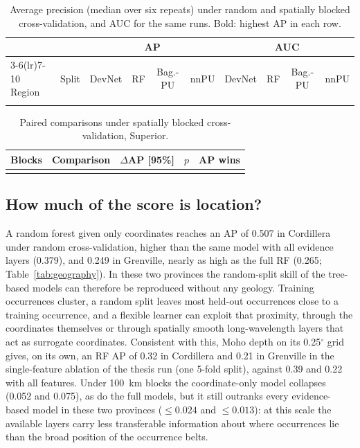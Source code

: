 \documentclass[pdflatex,sn-apa]{sn-jnl}
\begin{document}
\begin{table}[t]
\caption{Average precision (median over six repeats) under random and spatially blocked cross-validation, and AUC for the same runs. Bold: highest AP in each row.}\label{tab:spatial}
\scriptsize
\setlength{\tabcolsep}{2.5pt}
\begin{tabular*}{\textwidth}{@{\extracolsep\fill}llcccccccc}
\toprule
 & & \multicolumn{4}{c}{AP} & \multicolumn{4}{c}{AUC} \\
\cmidrule(lr){3-6}\cmidrule(lr){7-10}
Region & Split & DevNet & RF & Bag.-PU & nnPU & DevNet & RF & Bag.-PU & nnPU \\
\midrule
\botrule
\end{tabular*}
\end{table}

\begin{table}[t]
\caption{Paired comparisons under spatially blocked cross-validation, Superior.}\label{tab:spatial-boot}
\footnotesize
\begin{tabular*}{0.8\textwidth}{@{\extracolsep\fill}llccc}
\toprule
Blocks & Comparison & $\Delta$AP [95\%] & $p$ & AP wins \\
\midrule
\botrule
\end{tabular*}
\end{table}

\subsection{How much of the score is location?}\label{sec:res-geography}

A random forest given only coordinates reaches an AP of 0.507 in Cordillera under random cross-validation, higher than the same model with all evidence layers (0.379), and 0.249 in Grenville, nearly as high as the full RF (0.265; Table~\ref{tab:geography}). In these two provinces the random-split skill of the tree-based models can therefore be reproduced without any geology. Training occurrences cluster, a random split leaves most held-out occurrences close to a training occurrence, and a flexible learner can exploit that proximity, through the coordinates themselves or through spatially smooth long-wavelength layers that act as surrogate coordinates. Consistent with this, Moho depth on its 0.25$^\circ$ grid gives, on its own, an RF AP of 0.32 in Cordillera and 0.21 in Grenville in the single-feature ablation of the thesis run (one 5-fold split), against 0.39 and 0.22 with all features. Under 100~km blocks the coordinate-only model collapses (0.052 and 0.075), as do the full models, but it still outranks every evidence-based model in these two provinces ($\leq 0.024$ and $\leq 0.013$): at this scale the available layers carry less transferable information about where occurrences lie than the broad position of the occurrence belts.
\end{document}
